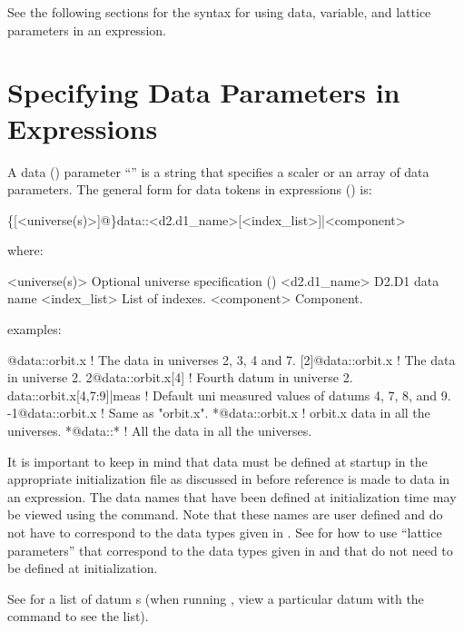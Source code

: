 See the following sections for the syntax for using data, variable, and
lattice parameters in an expression.

\section{Specifying Data Parameters in Expressions}
\label{s:data.token}

A data () parameter ``'' is a string that specifies a scaler or an array
of data parameters.  The general form for data tokens in expressions
() is:
\begin{example}
  \{[<universe(s)>]@\}data::<d2.d1_name>[<index_list>]|<component>
\end{example}
where:
\begin{example}
  <universe(s)>       Optional universe specification ()
  <d2.d1_name>        D2.D1 data name
  <index_list>        List of indexes.
  <component>         Component. 
\end{example}
examples:
\begin{example}
  [2:4,7]@data::orbit.x      ! The  data in universes 2, 3, 4 and 7.
  [2]@data::orbit.x          ! The  data in universe 2. 
  2@data::orbit.x[4]         ! Fourth  datum in universe 2.
  data::orbit.x[4,7:9]|meas  ! Default uni measured values of datums 4, 7, 8, and 9.
  -1@data::orbit.x           ! Same as "orbit.x".
  *@data::orbit.x            ! orbit.x data in all the universes.
  *@data::*                  ! All the data in all the universes.
\end{example}

It is important to keep in mind that data must be defined at startup in the appropriate
initialization file as discussed in  before reference is made to data in
an expression. The  data names that have been defined at initialization
time may be viewed using the  command. Note that these names are user
defined and do not have to correspond to the data types given in . See
 for how to use ``lattice parameters'' that correspond to the data types
given in  and that do not need to be defined at initialization.

See  for a list of datum s (when
running \tao, view a particular datum with the  command to see the list).


